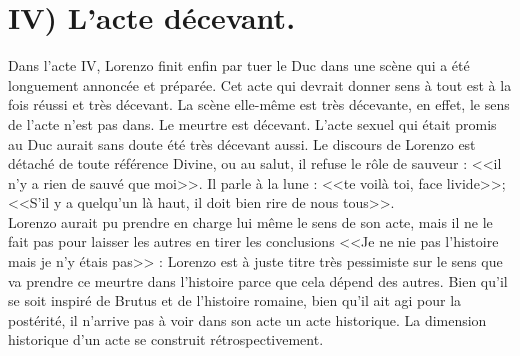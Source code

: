\documentclass[12pt]{article}
\begin{document}
\section*{\color{red}IV) L'acte décevant.}
Dans l'acte IV, Lorenzo finit enfin par tuer le Duc dans une scène qui a été longuement annoncée et préparée.
Cet acte qui devrait donner sens à tout est à la fois réussi et très décevant.
La scène elle-même est très décevante, en effet, le sens de l'acte n'est pas dans.
Le meurtre est décevant. L'acte sexuel qui était promis au Duc aurait sans doute été très décevant aussi.
Le discours de Lorenzo est détaché de toute référence Divine, ou au salut, il refuse le rôle de sauveur : <<il n'y a rien de sauvé que moi>>. Il parle à la lune : <<te voilà toi, face livide>>; <<S'il y a quelqu'un là haut, il doit bien rire de nous tous>>.\\
Lorenzo aurait pu prendre en charge lui même le sens de son acte, mais il ne le fait pas pour laisser les autres en tirer les conclusions <<Je ne nie pas l'histoire mais je n'y étais pas>> : Lorenzo est à juste titre très pessimiste sur le sens que va prendre ce meurtre dans l'histoire parce que cela dépend des autres.
Bien qu'il se soit inspiré de Brutus et de l'histoire romaine, bien qu'il ait agi pour la postérité, il n'arrive pas à voir dans son acte un acte historique.
La dimension historique d'un acte se construit rétrospectivement.
\end{document}
